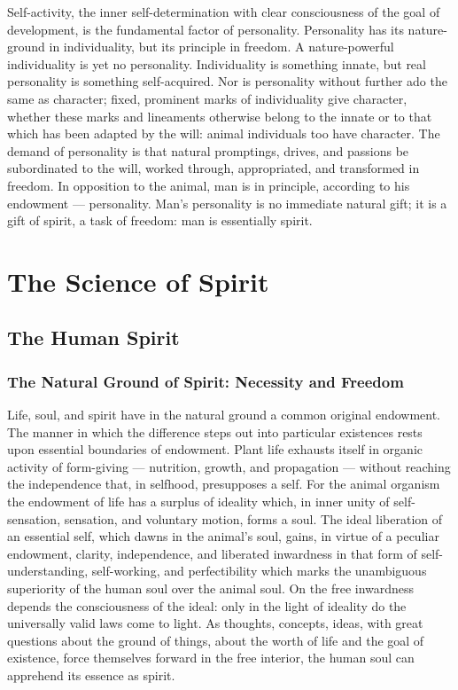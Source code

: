 \documentclass[12pt]{book}
\begin{document}
Self-activity, the inner self-determination with clear consciousness of the goal of
development, is the fundamental factor of personality. Personality has its nature-ground in
individuality, but its principle in freedom. A nature-powerful individuality is yet no
personality. Individuality is something innate, but real personality is something
self-acquired. Nor is personality without further ado the same as character; fixed, prominent
marks of individuality give character, whether these marks and lineaments otherwise belong to
the innate or to that which has been adapted by the will: animal individuals too have
character. The demand of personality is that natural promptings, drives, and passions be
subordinated to the will, worked through, appropriated, and transformed in freedom. In
opposition to the animal, man is in principle, according to his endowment --- personality.
Man's personality is no immediate natural gift; it is a gift of spirit, a task of freedom: man
is essentially spirit.


\part{The Science of Spirit}

\chapter{The Human Spirit}

\section{The Natural Ground of Spirit: Necessity and Freedom}
\label{sec:21en}

\noindent Life, soul, and spirit have in the natural ground a common original endowment.
The manner in which the difference steps out into particular existences rests upon
essential boundaries of endowment. Plant life exhausts itself in organic activity of
form-giving --- nutrition, growth, and propagation --- without reaching the independence
that, in selfhood, presupposes a self. For the animal organism the endowment of life has a
surplus of ideality which, in inner unity of self-sensation, sensation, and voluntary
motion, forms a soul. The ideal liberation of an essential self, which dawns in the
animal's soul, gains, in virtue of a peculiar endowment, clarity, independence, and
liberated inwardness in that form of self-understanding, self-working, and perfectibility
which marks the unambiguous superiority of the human soul over the animal soul. On the free
inwardness depends the consciousness of the ideal: only in the light of ideality do the
universally valid laws come to light. As thoughts, concepts, ideas, with great questions
about the ground of things, about the worth of life and the goal of existence, force
themselves forward in the free interior, the human soul can apprehend its essence as
spirit.
\end{document}
